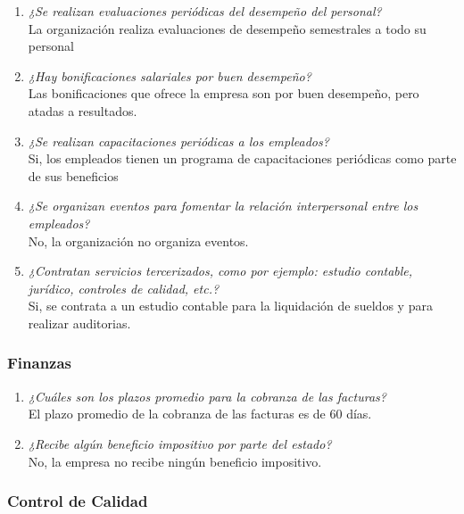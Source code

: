 \documentclass[a4paper,10pt]{article}
\begin{document}
\begin{enumerate}[resume]
			\item \textit{¿Se realizan evaluaciones periódicas del desempeño del personal?}\\
			La organización realiza evaluaciones de desempeño semestrales a todo su personal
			
			\item \textit{¿Hay bonificaciones salariales por buen desempeño?}\\
			Las bonificaciones que ofrece la empresa son por buen desempeño, pero atadas a resultados.
			
			\item \textit{¿Se realizan capacitaciones periódicas a los empleados?}\\
			Si, los empleados tienen un programa de capacitaciones periódicas como parte de sus beneficios
			
			\item \textit{¿Se organizan eventos para fomentar la relación interpersonal entre los empleados?}\\
			No, la organización no organiza eventos.
			
			\item \textit{¿Contratan servicios tercerizados, como por ejemplo: estudio contable, jurídico, controles de calidad, etc.?}\\
			Si, se contrata a un estudio contable para la liquidación de sueldos y para realizar auditorias.			

			\end{enumerate}
			
			
		\subsubsection{Finanzas}
		
		
			\begin{enumerate}[resume]
			
			\item \textit{¿Cuáles son los plazos promedio para la cobranza de las facturas?}\\
			El plazo promedio de la cobranza de las facturas es de 60 días.
			
			\item \textit{¿Recibe algún beneficio impositivo por parte del estado?}\\
			No, la empresa no recibe ningún beneficio impositivo.
			
			\end{enumerate}
		
		\subsubsection{Control de Calidad}
		
\end{document}
